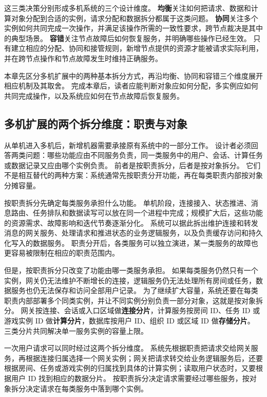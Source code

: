 这三类决策分别形成多机系统的三个设计维度。
\textbf{均衡}关注如何把请求、数据和计算对象分配到合适的实例，请求分配和数据拆分都属于这类问题。
\textbf{协同}关注多个实例如何共同完成一次操作，并满足该操作所需的一致性要求，跨节点裁决是其中的典型场景。
\textbf{容错}关注节点故障后如何恢复服务，并明确哪些操作已经生效。
只有建立相应的分配、协同和接管规则，新增节点提供的资源才能被请求实际利用，并在跨节点操作和节点故障发生时维持正确服务。

本章先区分多机扩展中的两种基本拆分方式，再沿均衡、协同和容错三个维度展开相应机制及其取舍。
完成本章后，读者应能判断对象应如何分配，多实例应如何共同完成操作，以及系统应如何在节点故障后恢复服务。

\subsection{多机扩展的两个拆分维度：职责与对象}\label{sec4:split-by-role-and-object}

从单机进入多机后，新增机器需要承接原有系统中的一部分工作。
设计者必须回答两类问题：哪些功能应由不同服务负责，同一类服务中的用户、会话、计算任务或数据记录又应由哪个实例负责。
前者是按职责拆分，后者是按对象拆分。
它们不是相互替代的两种方案：系统通常先按职责分开功能，再在每类职责内部按对象分摊容量。

按职责拆分先确定每类服务承担什么功能。
单机阶段，连接接入、状态推进、消息路由、任务排队和数据读写可以放在同一个进程中完成；规模扩大后，这些功能的资源需求、故障影响和迭代节奏逐渐分化。
系统可以据此拆出维护连接和转发消息的网关服务、处理请求和推进状态的业务逻辑服务，以及负责缓存访问和持久化写入的数据服务。
职责分开后，各类服务可以独立演进，某一类服务的故障也更容易被限制在相应的职责范围内。

但是，按职责拆分只改变了功能由哪一类服务承担。
如果每类服务仍然只有一个实例，网关仍无法维护不断增长的连接，逻辑服务仍无法处理所有房间或任务，数据服务也仍无法保存和访问全部用户记录。
为了继续扩大容量，系统还要在每类职责内部部署多个同类实例，并让不同实例分别负责一部分对象，这就是按对象拆分。
网关按连接、会话或入口区域做\textbf{连接分片}，计算服务按房间 ID、任务 ID 或游戏实例 ID 做\textbf{计算分片}，数据库按用户 ID、组织 ID 或区域 ID 做\textbf{存储分片}。
三类分片共同解决单一服务实例的容量上限。

一次用户请求可以同时经过这两个拆分维度。
系统先根据职责把请求交给网关服务，再根据连接归属选择一个网关实例；网关把请求转交给业务逻辑服务后，还要根据房间、任务或游戏实例的归属找到具体的计算实例；读取用户状态时，又要根据用户 ID 找到相应的数据分片。
按职责拆分决定请求需要经过哪些服务，按对象拆分决定请求在每类服务中落到哪个实例。

